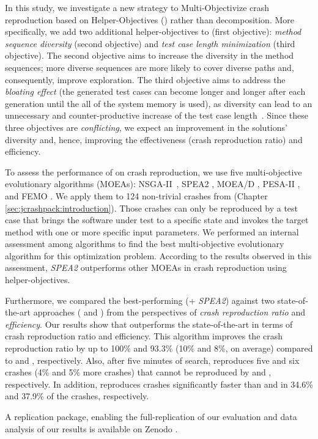 In this study, we investigate a new strategy to Multi-Objectivize crash reproduction based on Helper-Objectives (\moho) rather than decomposition. More specifically, we add two additional helper-objectives to \CrashFunction (first objective):  \textit{method sequence diversity} (second objective) and \textit{test case length minimization} (third objective). 
The second objective aims to increase the diversity in the method sequences; more diverse sequences are more likely to cover diverse paths and, consequently, improve exploration. The third objective aims to address the \textit{bloating effect} (\ie the generated test cases can become longer and longer after each generation until the all of the system memory is used), as diversity can lead to an unnecessary and counter-productive increase of the test case length~\cite{albunian2017diversity, Panichella2018}.
Since these three objectives are \textit{conflicting}, we expect an improvement in the solutions' diversity and, hence, improving the effectiveness (crash reproduction ratio) and efficiency. 


To assess the performance of \moho on crash reproduction, we use five multi-objective evolutionary algorithms (MOEAs): NSGA-II~\cite{deb2002fast}, SPEA2 \cite{zitzler2001spea2}, MOEA/D \cite{zhang2007moea}, PESA-II \cite{Corne2001}, and FEMO \cite{laumanns2002}. 
We apply them to 124 non-trivial crashes from \crashpack (Chapter \ref{sec:jcrashpack:introduction}). 
Those crashes can only be reproduced by a test case that brings the software under test to a specific state and invokes the target method with one or more specific input parameters. 
We performed an internal assessment among \moho algorithms to find the best multi-objective evolutionary algorithm for this optimization problem.
According to the results observed in this assessment, \textit{SPEA2} outperforms other MOEAs in crash reproduction using \moho helper-objectives.

Furthermore, we compared the best-performing \moho (\moho + \textit{SPEA2}) against two state-of-the-art  approaches (\SGGA \cite{Soltani2018a} and \decomposition \cite{Soltani2018b}) from the perspectives of \textit{crash reproduction ratio} and \textit{efficiency}. Our results show that \moho outperforms the state-of-the-art in terms of crash reproduction ratio and efficiency.
This algorithm improves the crash reproduction ratio by up to 100\% and 93.3\% (10\% and 8\%, on average) compared to \SGGA and \decomposition, respectively.
 Also, after five minutes of search, \moho reproduces five and six crashes (4\% and 5\% more crashes) that cannot be reproduced by \SGGA and \decomposition, respectively.
In addition, \moho reproduces crashes significantly faster than \SGGA and \decomposition in 34.6\% and 37.9\% of the crashes, respectively. 

A replication package, enabling the full-replication of our evaluation and data analysis of our results is available on Zenodo \cite{zenodoRP}. 